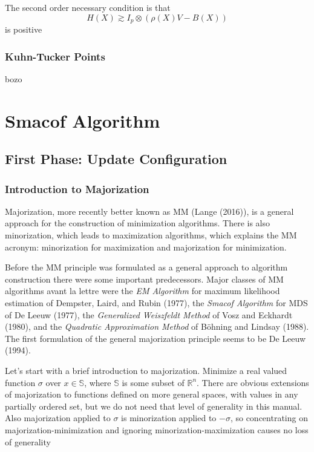 \documentclass[
  12pt,
]{article}
\begin{document}
The second order necessary condition is that \[
H(X)\gtrsim I_p\otimes (\rho(X)V - B(X))
\] is positive

\subsubsection{Kuhn-Tucker Points}\label{kuhn-tucker-points}

bozo

\section{Smacof Algorithm}\label{smacof-algorithm}

\subsection{First Phase: Update Configuration}\label{first-phase-update-configuration}

\subsubsection{Introduction to Majorization}\label{introduction-to-majorization}

Majorization, more recently better known as MM (Lange (2016)), is a general
approach for the construction of minimization algorithms. There is also
minorization, which leads to maximization algorithms, which explains the
MM acronym: minorization for maximization and majorization for
minimization.

Before the MM principle was formulated as a general approach to
algorithm construction there were some important predecessors. Major
classes of MM algorithms avant la lettre were the \emph{EM Algorithm} for
maximum likelihood estimation of Dempster, Laird, and Rubin (1977), the \emph{Smacof
Algorithm} for MDS of De Leeuw (1977), the \emph{Generalized Weiszfeldt Method}
of Vosz and Eckhardt (1980), and the \emph{Quadratic Approximation Method} of
Böhning and Lindsay (1988). The first formulation of the general majorization
principle seems to be De Leeuw (1994).

Let's start with a brief introduction to majorization. Minimize a real
valued function \(\sigma\) over \(x\in\mathbb{S}\), where \(\mathbb{S}\) is
some subset of \(\mathbb{R}^n\). There are obvious extensions of
majorization to functions defined on more general spaces, with values in
any partially ordered set, but we do not need that level of generality
in this manual. Also majorization applied to \(\sigma\) is minorization
applied to \(-\sigma\), so concentrating on majorization-minimization and
ignoring minorization-maximization causes no loss of generality
\end{document}
